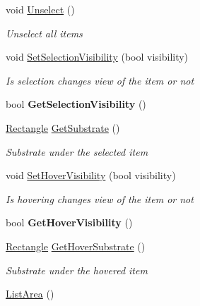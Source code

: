\begin{DoxyCompactItemize}
void \mbox{\hyperlink{class_space_v_i_l_1_1_list_area_ac7ed057dd6d34a265aaacca971c61b2b}{Unselect}} ()
\begin{DoxyCompactList}\small\item\em Unselect all items \end{DoxyCompactList}\item 
void \mbox{\hyperlink{class_space_v_i_l_1_1_list_area_afb9baa1b6b71d8223b3b2b86ed95dce1}{Set\+Selection\+Visibility}} (bool visibility)
\begin{DoxyCompactList}\small\item\em Is selection changes view of the item or not \end{DoxyCompactList}\item 
\mbox{\label{class_space_v_i_l_1_1_list_area_ae8372a3bdb6cfd42b0ecd3f5deb3bbf6}} 
bool {\bfseries Get\+Selection\+Visibility} ()
\item 
\mbox{\hyperlink{class_space_v_i_l_1_1_rectangle}{Rectangle}} \mbox{\hyperlink{class_space_v_i_l_1_1_list_area_a204ed17573d7651514702422b51f1389}{Get\+Substrate}} ()
\begin{DoxyCompactList}\small\item\em Substrate under the selected item \end{DoxyCompactList}\item 
void \mbox{\hyperlink{class_space_v_i_l_1_1_list_area_ab4a8ef41e41ece5524e49a0244f5fd21}{Set\+Hover\+Visibility}} (bool visibility)
\begin{DoxyCompactList}\small\item\em Is hovering changes view of the item or not \end{DoxyCompactList}\item 
\mbox{\label{class_space_v_i_l_1_1_list_area_a968022f6d0c8ec10b48fe4aa2e5561fd}} 
bool {\bfseries Get\+Hover\+Visibility} ()
\item 
\mbox{\hyperlink{class_space_v_i_l_1_1_rectangle}{Rectangle}} \mbox{\hyperlink{class_space_v_i_l_1_1_list_area_af2b6ef18d4cbaea198704bf1d0dac97a}{Get\+Hover\+Substrate}} ()
\begin{DoxyCompactList}\small\item\em Substrate under the hovered item \end{DoxyCompactList}\item 
\mbox{\hyperlink{class_space_v_i_l_1_1_list_area_a9ff09f668b7bbb22943905402aaa5938}{List\+Area}} ()

\end{DoxyCompactItemize}
